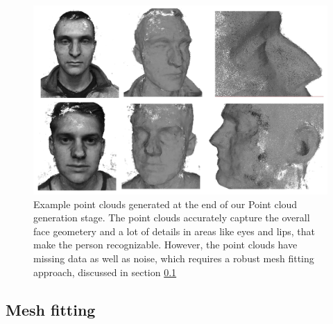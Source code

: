 \documentclass[10pt,twocolumn,letterpaper]{article}
\begin{document}
\begin{figure}[t]
\begin{center}
   \includegraphics[width=0.95\linewidth]{images/point_clouds_sample.png}
\end{center}
   \caption{Example point clouds generated at the end of our Point cloud generation stage. The point clouds accurately capture the overall face geometery and a lot of details in areas like eyes and lips, that make the person recognizable. However, the point clouds have missing data as well as noise, which requires a robust mesh fitting approach, discussed in section \ref{sec:mesh_fit}  }
\label{fig:pcl_sample}
\end{figure}

\subsection{Mesh fitting} \label{sec:mesh_fit}
\end{document}
